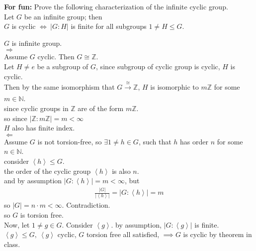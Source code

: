 \documentclass{article}
\begin{document}
\begin{homeworkProblem}
    \textbf{For fun: } Prove the following characterization 
    of the infinite cyclic group.\\
    Let $G$ be an infinite group; then\\
    $G$ is cyclic $\iff \ \lvert G:H \rvert$ is finite for all subgroups $1 \neq H \leq G$.\\
    \solution

    $G$ is infinite group.\\
    $\Rightarrow$\\
    Assume $G$ cyclic. Then $G \cong \mathbb{Z}$.\\
    Let $H \neq e$ be a subgroup of $G$, 
    since subgroup of cyclic group is cyclic, $H$ is cyclic.\\
    Then by the same isomorphism that $G \xrightarrow[]{\cong} \mathbb{Z}$,
    $H$ is isomorphic to $m \mathbb{Z}$ for some $m \in \mathbb{N}$. \\
    since cyclic groups in $\mathbb{Z}$ are of the form $m \mathbb{Z}$.\\
    so since $\lvert \mathbb{Z} : m \mathbb{Z} \rvert = m < \infty$\\
    $H$ also has finite index.\\
    $\Leftarrow$\\
    Assume $G$ is not torsion-free, so $\exists 1 \neq h \in G$,
    such that $h$ has order $n$ for some $n \in \mathbb{N}$.\\
    consider $\left\langle h \right\rangle \leq G$.\\
    the order of the cyclic group $\left\langle h \right\rangle$ is also $n$.\\
    and by assumption $\lvert G: \left\langle h \right\rangle \rvert = m < \infty$,
    but 
    \begin{align}
        \frac{ \lvert G \rvert }{ \lvert \left\langle h \right\rangle \rvert } = \lvert G: \left\langle h \right\rangle \rvert = m
    \end{align}
    so $\lvert G \rvert = n \cdot m < \infty$. Contradiction.\\
    so $G$ is torsion free.\\
    Now, let $1 \neq g \in G$. 
    Consider $\left\langle g \right\rangle$.
    by assumption, $\lvert G : \left\langle g \right\rangle \rvert$
    is finite.\\
    $\left\langle g \right\rangle \leq G, \ \left\langle g \right\rangle$ cyclic,
    $G$ torsion free all satisfied,
    $\implies G$ is cyclic by theorem in class.\\


    
    
\end{homeworkProblem}
\end{document}

